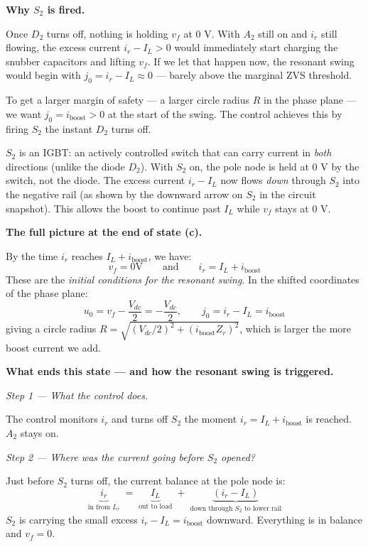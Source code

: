 \documentclass[12pt, a4paper]{article}
\def\,{ }%
\newcommand{\Vdc}{V_{dc}}
\newcommand{\vf}{v_f}
\newcommand{\ir}{i_r}
\newcommand{\IL}{I_L}
\newcommand{\Lr}{L_r}
\newcommand{\Zr}{Z_r}
\begin{document}
\medskip
\textbf{Why $S_2$ is fired.}

Once $D_2$ turns off, nothing is holding $\vf$ at 0\,V.
With $A_2$ still on and $\ir$ still flowing, the excess current
$\ir - \IL > 0$ would immediately start charging the snubber
capacitors and lifting $\vf$.
If we let that happen now, the resonant swing would begin with
$j_0 = \ir - \IL \approx 0$ --- barely above the marginal ZVS threshold.

To get a larger margin of safety --- a larger circle radius $R$ in the
phase plane --- we want $j_0 = i_\text{boost} > 0$ at the start of the swing.
The control achieves this by firing $S_2$ the instant $D_2$ turns off.

$S_2$ is an IGBT: an actively controlled switch that can carry current in
\emph{both} directions (unlike the diode $D_2$).
With $S_2$ on, the pole node is held at 0\,V by the switch, not the diode.
The excess current $\ir - \IL$ now flows \emph{down} through $S_2$ into
the negative rail (as shown by the downward arrow on $S_2$ in the circuit
snapshot).
This allows the boost to continue past $\IL$ while $\vf$ stays at 0\,V.

\medskip
\textbf{The full picture at the end of state (c).}

By the time $\ir$ reaches $\IL + i_\text{boost}$, we have:
\begin{equation}
    \vf = 0\,\text{V} \qquad \text{and} \qquad
    \ir = \IL + i_\text{boost}
    \label{eq:stateC_ic}
\end{equation}
These are the \emph{initial conditions for the resonant swing}.
In the shifted coordinates of the phase plane:
\begin{equation*}
    u_0 = \vf - \frac{\Vdc}{2} = -\frac{\Vdc}{2}, \qquad
    j_0 = \ir - \IL = i_\text{boost}
\end{equation*}
giving a circle radius $R = \sqrt{(\Vdc/2)^2 + (i_\text{boost}\,\Zr)^2}$,
which is larger the more boost current we add.

\medskip
\textbf{What ends this state — and how the resonant swing is triggered.}

\textit{Step 1 — What the control does.}

The control monitors $\ir$ and turns off $S_2$ the moment
$\ir = \IL + i_\text{boost}$ is reached.
$A_2$ stays on.

\medskip
\textit{Step 2 — Where was the current going before $S_2$ opened?}

Just before $S_2$ turns off, the current balance at the pole node is:
\begin{equation*}
    \underbrace{\ir}_{\text{in from } \Lr}
    \;=\;
    \underbrace{\IL}_{\text{out to load}}
    \;+\;
    \underbrace{(\ir - \IL)}_{\text{down through } S_2 \text{ to lower rail}}
\end{equation*}
$S_2$ is carrying the small excess $\ir - \IL = i_\text{boost}$ downward.
Everything is in balance and $\vf = 0$.
\end{document}
